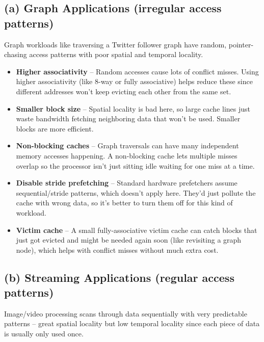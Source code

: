 \documentclass[11pt]{article}
\begin{document}
\subsection*{(a) Graph Applications (irregular access patterns)}

Graph workloads like traversing a Twitter follower graph have random, pointer-chasing access patterns with poor spatial and temporal locality.

\begin{itemize}[leftmargin=*]
  \item \textbf{Higher associativity} -- Random accesses cause lots of conflict misses. Using higher associativity (like 8-way or fully associative) helps reduce these since different addresses won't keep evicting each other from the same set.

  \item \textbf{Smaller block size} -- Spatial locality is bad here, so large cache lines just waste bandwidth fetching neighboring data that won't be used. Smaller blocks are more efficient.

  \item \textbf{Non-blocking caches} -- Graph traversals can have many independent memory accesses happening. A non-blocking cache lets multiple misses overlap so the processor isn't just sitting idle waiting for one miss at a time.

  \item \textbf{Disable stride prefetching} -- Standard hardware prefetchers assume sequential/stride patterns, which doesn't apply here. They'd just pollute the cache with wrong data, so it's better to turn them off for this kind of workload.

  \item \textbf{Victim cache} -- A small fully-associative victim cache can catch blocks that just got evicted and might be needed again soon (like revisiting a graph node), which helps with conflict misses without much extra cost.
\end{itemize}

\subsection*{(b) Streaming Applications (regular access patterns)}

Image/video processing scans through data sequentially with very predictable patterns -- great spatial locality but low temporal locality since each piece of data is usually only used once.
\end{document}
